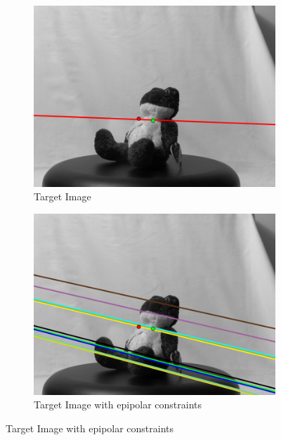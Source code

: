 \documentclass[review]{elsarticle}
\begin{document}
\begin{figure}[htb]
    \quad %
    \begin{subfigure}[t]{0.22\columnwidth}
        \centering
        \includegraphics[width=\columnwidth]{images/Frog_C}
        \caption{Target Image}
        \label{fig:frog_c}
    \end{subfigure}%
    \quad %
    \begin{subfigure}[t]{0.22\columnwidth}
        \centering
        \includegraphics[width=\columnwidth]{images/Frog_C_lines}
        \caption{Target Image with epipolar constraints}

\end{subfigure}
\end{figure}
\end{document}
